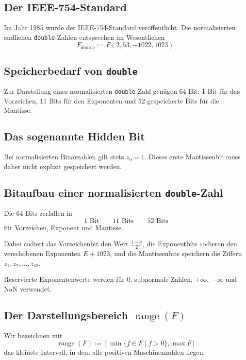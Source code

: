 \documentclass{article}
\begin{document}
\subsection*{Der IEEE-754-Standard}

Im Jahr 1985 wurde der IEEE-754-Standard veröffentlicht. Die normalisierten endlichen \texttt{double}-Zahlen entsprechen im Wesentlichen
\[
F_{\text{double}}:=F(2,53,-1022,1023).
\]

\subsection*{Speicherbedarf von \texttt{double}}

Zur Darstellung einer normalisierten \texttt{double}-Zahl genügen 64 Bit: 1 Bit für das Vorzeichen, 11 Bits für den Exponenten und 52 gespeicherte Bits für die Mantisse.

\subsection*{Das sogenannte Hidden Bit}

Bei normalisierten Binärzahlen gilt stets \(z_0=1\). Dieses erste Mantissenbit muss daher nicht explizit gespeichert werden.

\subsection*{Bitaufbau einer normalisierten \texttt{double}-Zahl}

Die 64 Bits zerfallen in
\[
\boxed{\text{1 Bit}}
\qquad
\boxed{\text{11 Bits}}
\qquad
\boxed{\text{52 Bits}}
\]
für Vorzeichen, Exponent und Mantisse.

Dabei codiert das Vorzeichenbit den Wert \(\frac{1-\sigma}{2}\), die Exponentbits codieren den verschobenen Exponenten \(E+1023\), und die Mantissenbits speichern die Ziffern \(z_1,z_2,\dots,z_{52}\).

Reservierte Exponentenwerte werden für \(0\), subnormale Zahlen, \(+\infty\), \(-\infty\) und NaN verwendet.

\subsection*{Der Darstellungsbereich \(\operatorname{range}(F)\)}

Wir bezeichnen mit
\[
\operatorname{range}(F)
:=
\left[
\min\{f\in F\mid f>0\},
\max F
\right]
\]
das kleinste Intervall, in dem alle positiven Maschinenzahlen liegen.
\end{document}
